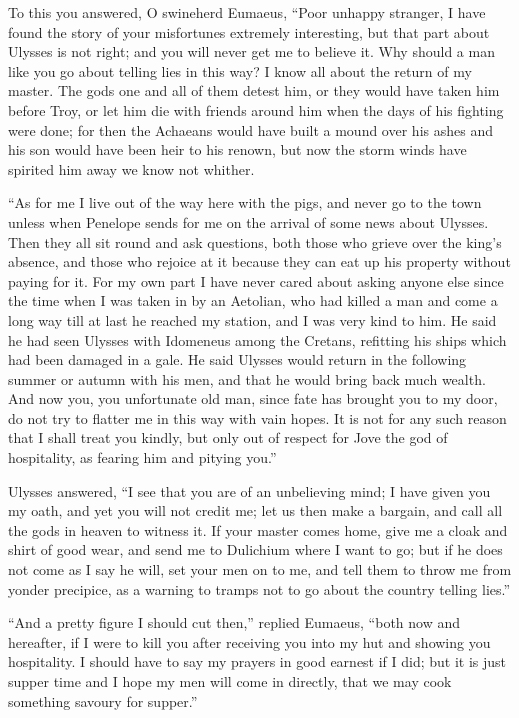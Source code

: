 To this you answered, O swineherd Eumaeus, “Poor unhappy stranger, I have found
the story of your misfortunes extremely interesting, but that part about
Ulysses is not right; and you will never get me to believe it. Why should a man
like you go about telling lies in this way? I know all about the return of my
master. The gods one and all of them detest him, or they would have taken him
before Troy, or let him die with friends around him when the days of his
fighting were done; for then the Achaeans would have built a mound over his
ashes and his son would have been heir to his renown, but now the storm winds
have spirited him away we know not whither.

“As for me I live out of the way here with the pigs, and never go to the town
unless when Penelope sends for me on the arrival of some news about Ulysses.
Then they all sit round and ask questions, both those who grieve over the
king’s absence, and those who rejoice at it because they can eat up his
property without paying for it. For my own part I have never cared about asking
anyone else since the time when I was taken in by an Aetolian, who had killed a
man and come a long way till at last he reached my station, and I was very kind
to him. He said he had seen Ulysses with Idomeneus among the Cretans, refitting
his ships which had been damaged in a gale. He said Ulysses would return in the
following summer or autumn with his men, and that he would bring back much
wealth. And now you, you unfortunate old man, since fate has brought you to my
door, do not try to flatter me in this way with vain hopes. It is not for any
such reason that I shall treat you kindly, but only out of respect for Jove the
god of hospitality, as fearing him and pitying you.”

Ulysses answered, “I see that you are of an unbelieving mind; I have given you
my oath, and yet you will not credit me; let us then make a bargain, and call
all the gods in heaven to witness it. If your master comes home, give me a
cloak and shirt of good wear, and send me to Dulichium where I want to go; but
if he does not come as I say he will, set your men on to me, and tell them to
throw me from yonder precipice, as a warning to tramps not to go about the
country telling lies.”

“And a pretty figure I should cut then,” replied Eumaeus, “both now and
hereafter, if I were to kill you after receiving you into my hut and showing
you hospitality. I should have to say my prayers in good earnest if I did; but
it is just supper time and I hope my men will come in directly, that we may
cook something savoury for supper.”

